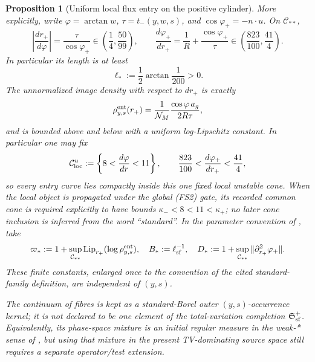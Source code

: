 \documentclass[11pt]{article}
\newtheorem{proposition}[theorem]{Proposition}
\begin{document}
\begin{proposition}[Uniform local flux entry on the positive cylinder]
More explicitly, write $\varphi=\arctan w$, $\tau=t_-(y,w,s)$, and
$\cos\varphi_+=-n\cdot u$.  On $\mathcal C_{**}$,
\begin{equation}
\label{eq:fixed-section-entry-curve-derivatives}
 \left|\frac{dr_+}{d\varphi}\right|
 =\frac{\tau}{\cos\varphi_+}\in\left(\frac14,\frac{50}{99}\right),
 \qquad
 \frac{d\varphi_+}{dr_+}
 =\frac1R+\frac{\cos\varphi_+}{\tau}
 \in\left(\frac{823}{100},\frac{41}{4}\right).
\end{equation}
In particular its length is at least
\begin{equation}
\label{eq:fixed-section-entry-length-floor}
 \ell_*:=\frac12\arctan\frac1{200}>0.
\end{equation}
The unnormalized image density with respect to $dr_+$ is exactly
\begin{equation}
\label{eq:fixed-section-entry-density}
 \rho_{y,s}^{\rm ent}(r_+)
 =\frac1{\mathcal N_M}\frac{\cos\varphi\,a_g}{2R\tau},
\end{equation}
and is bounded above and below with a uniform log-Lipschitz constant.
In particular one may fix
\begin{equation}
\label{eq:fixed-section-local-cone-inclusion}
 \mathcal C_{\rm loc}^u
 :=\left\{8<\frac{d\varphi}{dr}<11\right\},
 \qquad
 \frac{823}{100}<\frac{d\varphi_+}{dr_+}<\frac{41}{4},
\end{equation}
so every entry curve lies compactly inside this one fixed local unstable
cone.  When the local object is propagated under the global
\textup{(FS2)} gate, its recorded common cone is required explicitly to
have bounds $\kappa_-<8<11<\kappa_+$; no later cone inclusion is inferred
from the word ``standard''.  In the parameter convention of
\cite[Definition~4.2]{CanestrariHoles}, take
\begin{equation}
\label{eq:fixed-section-local-family-constants}
 \varpi_*:=1+\sup_{\mathcal C_{**}}
             \operatorname{Lip}_{r_+}(\log\rho_{y,s}^{\rm ent}),
 \quad B_*:=\ell_{\rm sf}^{-1},
 \quad
 D_*:=1+\sup_{\mathcal C_{**}}\|\partial_{r_+}^2\varphi_+\|.
\end{equation}
These finite constants, enlarged once to the convention of the cited
standard-family definition, are independent of $(y,s)$.

The continuum of fibres is kept as a standard-Borel outer
$(y,s)$-occurrence kernel; it is not declared to be one element of the
total-variation completion $\mathfrak S_{\rm sf}^{+}$.  Equivalently, its
phase-space mixture is an initial regular measure in the weak-* sense of
\cite[Definition~5.3 and Lemma~5.8]{CanestrariHoles}, but using that mixture
in the present TV-dominating source space still requires a separate
operator/test extension.
\end{proposition}
\end{document}
